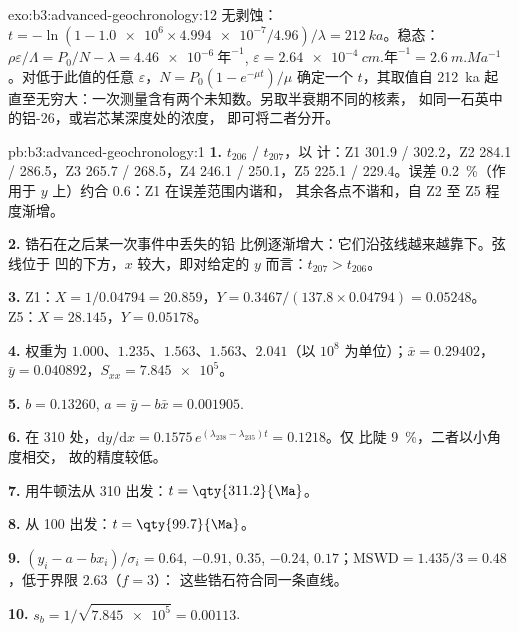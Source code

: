 \begin{solution}{exo:b3:advanced-geochronology:12}
无剥蚀：$t = -\ln(1 - \num{1.0e6}\times\num{4.994e-7}/4.96)/\lambda =
\qty{212}{ka}$。稳态：$\rho\varepsilon/\Lambda = P_0/N - \lambda =
\qty{4.46e-6}{\text{年}^{-1}}$, $\varepsilon = \qty{2.64e-4}{cm.\text{年}^{-1}} =
\qty{2.6}{m.Ma^{-1}}$。对低于此值的任意 $\varepsilon$，$N =
P_0(1 - e^{-\mu t})/\mu$ 确定一个 $t$，其取值自 \qty{212}{ka} 起
直至无穷大：一次测量含有两个未知数。另取半衰期不同的核素，
如同一石英中的铝-26，或岩芯某深度处的浓度，
即可将二者分开。
\end{solution}

\begin{solution}{pb:b3:advanced-geochronology:1}
\textbf{1.} $t_{206}$ / $t_{207}$，以 \unit{\Ma} 计：Z1 301.9 / 302.2，Z2 284.1 /
286.5，Z3 265.7 / 268.5，Z4 246.1 / 250.1，Z5 225.1 / 229.4。误差
\qty{0.2}{\percent}（作用于 $y$ 上）约合 \qty{0.6}{\Ma}：Z1 在误差范围内谐和，
其余各点不谐和，自 Z2 至 Z5 程度渐增。

\textbf{2.} 锆石在之后某一次事件中丢失的铅
比例逐渐增大：它们沿弦线越来越靠下。弦线位于
凹的下方，$x$ 较大，即对给定的 $y$ 而言：$t_{207} > t_{206}$。

\textbf{3.} Z1：$X = 1/0.04794 = 20.859$，$Y = 0.3467/(137.8\times0.04794) =
0.05248$。Z5：$X = 28.145$，$Y = 0.05178$。

\textbf{4.} 权重为 $1.000$、$1.235$、$1.563$、$1.563$、$2.041$（以
$10^8$ 为单位）；$\bar x = 0.29402$，$\bar y = 0.040892$，$S_{xx} = \num{7.845e5}$。

\textbf{5.} $b = 0.13260$, $a = \bar y - b\bar x = 0.001905$.

\textbf{6.} 在 \qty{310}{\Ma} 处，$\mathrm dy/\mathrm dx = 0.1575\,
e^{(\lambda_{238} - \lambda_{235})t} = 0.1218$。仅
比陡 \qty{9}{\percent}，二者以小角度相交，
故的精度较低。

\textbf{7.} 用牛顿法从 \qty{310}{\Ma} 出发：$t = \qty{311.2}{\Ma}$。

\textbf{8.} 从 \qty{100}{\Ma} 出发：$t = \qty{99.7}{\Ma}$。

\textbf{9.} $(y_i - a - bx_i)/\sigma_i = 0.64$, $-0.91$, $0.35$, $-0.24$,
$0.17$；$\mathrm{MSWD} = 1.435/3 = 0.48$，低于界限 $2.63$（$f = 3$）：
这些锆石符合同一条直线。

\textbf{10.} $s_b = 1/\sqrt{\num{7.845e5}} = 0.00113$.


\end{solution}
